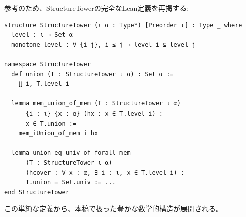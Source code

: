\documentclass[a4paper,12pt]{ltjsarticle}
\theoremstyle{definition}
\begin{document}
参考のため、StructureTowerの完全なLean定義を再掲する:

\begin{tcolorbox}[title=StructureTowerの定義]
\begin{verbatim}
structure StructureTower (ι α : Type*) [Preorder ι] : Type _ where
  level : ι → Set α
  monotone_level : ∀ {i j}, i ≤ j → level i ⊆ level j

namespace StructureTower
  def union (T : StructureTower ι α) : Set α :=
    ⋃ i, T.level i

  lemma mem_union_of_mem (T : StructureTower ι α)
      {i : ι} {x : α} (hx : x ∈ T.level i) :
      x ∈ T.union :=
    mem_iUnion_of_mem i hx

  lemma union_eq_univ_of_forall_mem
      (T : StructureTower ι α)
      (hcover : ∀ x : α, ∃ i : ι, x ∈ T.level i) :
      T.union = Set.univ := ...
end StructureTower
\end{verbatim}
\end{tcolorbox}

この単純な定義から、本稿で扱った豊かな数学的構造が展開される。
\end{document}
